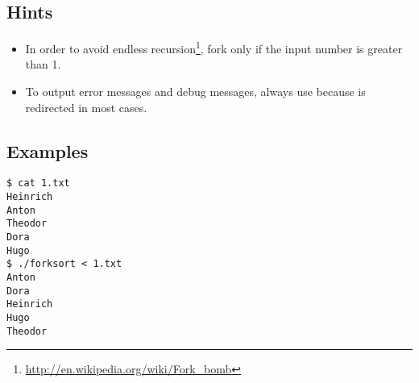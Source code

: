 

\subsection*{Hints}

\begin{itemize}
\item In order to avoid endless recursion\footnote{\url{http://en.wikipedia.org/wiki/Fork\_bomb}},
fork only if the input number is greater than 1.
\item To output error messages and debug messages, always use
 because  is redirected in most cases.
\end{itemize}

\subsection*{Examples}
\begin{verbatim}
$ cat 1.txt
Heinrich
Anton
Theodor
Dora
Hugo
$ ./forksort < 1.txt
Anton
Dora
Heinrich
Hugo
Theodor
\end{verbatim}



\osueguidelinestwo


